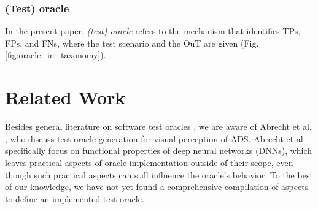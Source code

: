 \documentclass[conference]{IEEEtran}
\begin{document}







\subsubsection{(Test) oracle} \label{def:oracle} 
In the present paper, \textit{(test) oracle} refers to the mechanism that identifies TPs, FPs, and FNs, where the test scenario and the OuT are given (Fig. \ref{fig:oracle_in_taxonomy}).




\section{Related Work}
\label{sec:related_work}

Besides general literature on software test oracles \cite{Barr2015oracle}, we are aware of Abrecht et al. \cite{Abrecht2021testing}, who discuss test oracle generation for visual perception of ADS.
Abrecht et al. specifically focus on functional properties of deep neural networks (DNNs), which leaves practical aspects of oracle implementation outside of their scope, even though such practical aspects can still influence the oracle's behavior.
To the best of our knowledge, we have not yet found a comprehensive compilation of aspects to define an implemented test oracle.
\end{document}

